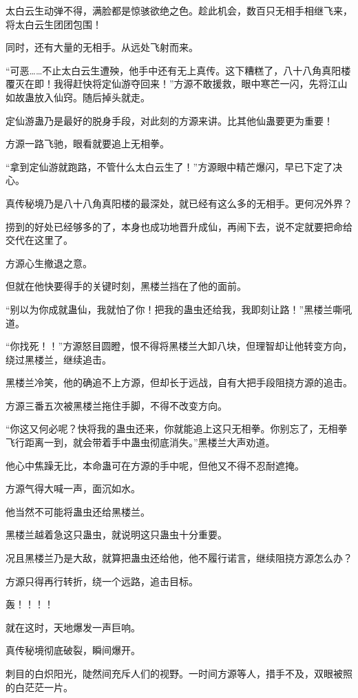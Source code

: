 \begin{this_body}
太白云生动弹不得，满脸都是惊骇欲绝之色。趁此机会，数百只无相手相继飞来，将太白云生团团包围！

同时，还有大量的无相手。从远处飞射而来。

“可恶……不止太白云生遭殃，他手中还有无上真传。这下糟糕了，八十八角真阳楼覆灭在即！我得赶快将定仙游夺回来！”方源不敢援救，眼中寒芒一闪，先将江山如故蛊放入仙窍。随后掉头就走。

定仙游蛊乃是最好的脱身手段，对此刻的方源来讲。比其他仙蛊要更为重要！

方源一路飞驰，眼看就要追上无相拳。

“拿到定仙游就跑路，不管什么太白云生了！”方源眼中精芒爆闪，早已下定了决心。

真传秘境乃是八十八角真阳楼的最深处，就已经有这么多的无相手。更何况外界？

捞到的好处已经够多的了，本身也成功地晋升成仙，再闹下去，说不定就要把命给交代在这里了。

方源心生撤退之意。

但就在他快要得手的关键时刻，黑楼兰挡在了他的面前。

“别以为你成就蛊仙，我就怕了你！把我的蛊虫还给我，我即刻让路！”黑楼兰嘶吼道。

“你找死！！”方源怒目圆瞪，恨不得将黑楼兰大卸八块，但理智却让他转变方向，绕过黑楼兰，继续追击。

黑楼兰冷笑，他的确追不上方源，但却长于远战，自有大把手段阻挠方源的追击。

方源三番五次被黑楼兰拖住手脚，不得不改变方向。

“你这又何必呢？快将我的蛊虫还来，你就能追上这只无相拳。你别忘了，无相拳飞行距离一到，就会带着手中蛊虫彻底消失。”黑楼兰大声劝道。

他心中焦躁无比，本命蛊可在方源的手中呢，但他又不得不忍耐遮掩。

方源气得大喊一声，面沉如水。

他当然不可能将蛊虫还给黑楼兰。

黑楼兰越着急这只蛊虫，就说明这只蛊虫十分重要。

况且黑楼兰乃是大敌，就算把蛊虫还给他，他不履行诺言，继续阻挠方源怎么办？

方源只得再行转折，绕一个远路，追击目标。

轰！！！！

就在这时，天地爆发一声巨响。

真传秘境彻底破裂，瞬间爆开。

刺目的白炽阳光，陡然间充斥人们的视野。一时间方源等人，措手不及，双眼被照的白茫茫一片。


\end{this_body}
